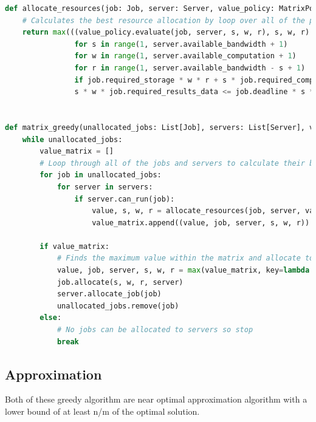 \begin{lstlisting}[language=Python]
def allocate_resources(job: Job, server: Server, value_policy: MatrixPolicy):
    # Calculates the best resource allocation by loop over all of the possible allocations that satisfy the deadline constraint
    return max(((value_policy.evaluate(job, server, s, w, r), s, w, r)
                for s in range(1, server.available_bandwidth + 1)
                for w in range(1, server.available_computation + 1)
                for r in range(1, server.available_bandwidth - s + 1)
                if job.required_storage * w * r + s * job.required_computation * r +
                s * w * job.required_results_data <= job.deadline * s * w * r), key=lambda x: x[0])


def matrix_greedy(unallocated_jobs: List[Job], servers: List[Server], value_policy: MatrixPolicy):
    while unallocated_jobs:
        value_matrix = []
        # Loop through all of the jobs and servers to calculate their best resource allocation
        for job in unallocated_jobs:
            for server in servers:
                if server.can_run(job):
                    value, s, w, r = allocate_resources(job, server, value_policy)
                    value_matrix.append((value, job, server, s, w, r))

        if value_matrix:
            # Finds the maximum value within the matrix and allocate to job and server
            value, job, server, s, w, r = max(value_matrix, key=lambda x: x[0])
            job.allocate(s, w, r, server)
            server.allocate_job(job)
            unallocated_jobs.remove(job)
        else:
            # No jobs can be allocated to servers so stop
            break
\end{lstlisting}

\subsection{Approximation}\label{subsec:approximation}
Both of these greedy algorithm are near optimal approximation algorithm with a lower bound of at least n/m of the
optimal solution.

